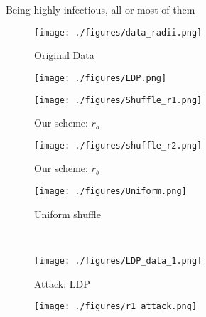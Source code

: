 Being highly infectious, all or most of them 
\begin{figure*}[t]
\begin{minipage}{0.2\linewidth}
\begin{subfigure}[b]{\linewidth}
\centering
    \texttt{[image: ./figures/data\_radii.png]}
        \caption{Original Data}
        \label{fig:data}
    \end{subfigure}
    \end{minipage}
    \begin{minipage}{0.8\linewidth}
    \begin{subfigure}[b]{0.25\linewidth}\centering
    \texttt{[image: ./figures/LDP.png]}\vspace{-0.25cm}
        \caption{\ldp}
        \label{fig:ldp}
    \end{subfigure}%
    \begin{subfigure}[b]{0.25\linewidth}\centering
    \texttt{[image: ./figures/Shuffle\_r1.png]}\vspace{-0.25cm}
        \caption{Our scheme: $r_a$}
        \label{fig:r}\end{subfigure}%
    \begin{subfigure}[b]{0.25\linewidth}\centering
    \texttt{[image: ./figures/shuffle\_r2.png]}\vspace{-0.25cm}
        \caption{Our scheme: $r_b$}
        \label{fig:R}\end{subfigure}%
      \begin{subfigure}[b]{0.25\linewidth}\centering
    \texttt{[image: ./figures/Uniform.png]}\vspace{-0.25cm}
        \caption{Uniform shuffle}
        \label{fig:uniform}
    \end{subfigure}\\ \vspace{-0.05cm}
    \begin{subfigure}[b]{0.25\linewidth}\centering
    \texttt{[image: ./figures/LDP\_data\_1.png]}\vspace{-0.25cm}
        \caption{Attack: LDP}
        \label{fig:ldp:attack}
    \end{subfigure}%
    \begin{subfigure}[b]{0.25\linewidth}\centering
  \texttt{[image: ./figures/r1\_attack.png]}\vspace{-0.25cm}

\end{subfigure}
\end{minipage}
\end{figure*}
